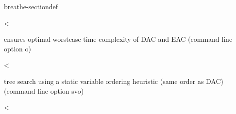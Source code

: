 \documentclass[letterpaper,10pt,openany,oneside,english]{sphinxmanual}
\begin{document}
\begin{fulllineitems}
\begin{sphinxuseclass}{breathe-sectiondef}
\begin{fulllineitems}
\label{\detokenize{ref/ref_cpp:_CPPv4N8ToulBar224Static_variable_orderingE}}\label{\detokenize{ref/ref_cpp:_CPPv3N8ToulBar224Static_variable_orderingE}}\label{\detokenize{ref/ref_cpp:_CPPv2N8ToulBar224Static_variable_orderingE}}\label{\detokenize{ref/ref_cpp:ToulBar2::Static_variable_ordering__b}}
\pysigstartsignatures
\pysigstartmultiline
{}
\pysigstopmultiline
\pysigstopsignatures
\sphinxAtStartPar
\textless{} 

\sphinxAtStartPar
ensures optimal worst\sphinxhyphen{}case time complexity of DAC and EAC (command line option \sphinxhyphen{}o) 

\end{fulllineitems}


\begin{fulllineitems}
\label{\detokenize{ref/ref_cpp:_CPPv4N8ToulBar212lastConflictE}}\label{\detokenize{ref/ref_cpp:_CPPv3N8ToulBar212lastConflictE}}\label{\detokenize{ref/ref_cpp:_CPPv2N8ToulBar212lastConflictE}}\label{\detokenize{ref/ref_cpp:ToulBar2::lastConflict__b}}
\pysigstartsignatures
\pysigstartmultiline
{}
\pysigstopmultiline
\pysigstopsignatures
\sphinxAtStartPar
\textless{} 

\sphinxAtStartPar
tree search using a static variable ordering heuristic (same order as DAC) (command line option \sphinxhyphen{}svo) 

\end{fulllineitems}


\begin{fulllineitems}
\label{\detokenize{ref/ref_cpp:_CPPv4N8ToulBar214weightedDegreeE}}\label{\detokenize{ref/ref_cpp:_CPPv3N8ToulBar214weightedDegreeE}}\label{\detokenize{ref/ref_cpp:_CPPv2N8ToulBar214weightedDegreeE}}\label{\detokenize{ref/ref_cpp:ToulBar2::weightedDegree__i}}
\pysigstartsignatures
\pysigstartmultiline
{}
\pysigstopmultiline
\pysigstopsignatures
\sphinxAtStartPar
\textless{} 


\end{fulllineitems}
\end{sphinxuseclass}
\end{fulllineitems}
\end{document}
